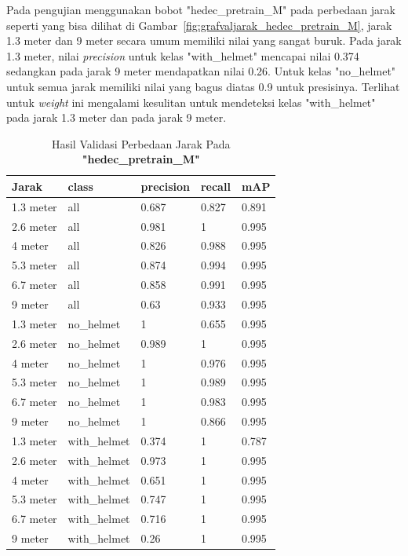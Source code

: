 \begin{enumerate}
  \par Pada pengujian menggunakan bobot "hedec\_pretrain\_M" pada perbedaan jarak seperti yang bisa dilihat di Gambar~\ref{fig:grafvaljarak_hedec_pretrain_M}, jarak 1.3 meter dan 9 meter
  secara umum memiliki nilai yang sangat buruk. Pada jarak 1.3 meter, nilai \emph{precision} untuk kelas "with\_helmet"
  mencapai nilai 0.374 sedangkan pada jarak 9 meter mendapatkan nilai 0.26. Untuk kelas "no\_helmet" untuk semua jarak memiliki
  nilai yang bagus diatas 0.9 untuk presisinya. Terlihat untuk \emph{weight} ini mengalami kesulitan untuk mendeteksi
  kelas "with\_helmet" pada jarak 1.3 meter dan pada jarak 9 meter.


  \begin{longtable}{|l|l|l|l|l|} 
    \caption{Hasil Validasi Perbedaan Jarak Pada \textbf{"hedec\_pretrain\_M"}}
    \label{tb:hasiljarak_hedec_pretrain_M}\\
    \hline
    Jarak     & class        & precision & recall & mAP    \\ 
    \hline
    1.3 meter & all          & 0.687     & 0.827  & 0.891  \\
    2.6 meter & all          & 0.981     & 1      & 0.995  \\
    4 meter   & all          & 0.826     & 0.988  & 0.995  \\
    5.3 meter & all          & 0.874     & 0.994  & 0.995  \\
    6.7 meter & all          & 0.858     & 0.991  & 0.995  \\
    9 meter   & all          & 0.63      & 0.933  & 0.995  \\
    1.3 meter & no\_helmet   & 1         & 0.655  & 0.995  \\
    2.6 meter & no\_helmet   & 0.989     & 1      & 0.995  \\
    4 meter   & no\_helmet   & 1         & 0.976  & 0.995  \\
    5.3 meter & no\_helmet   & 1         & 0.989  & 0.995  \\
    6.7 meter & no\_helmet   & 1         & 0.983  & 0.995  \\
    9 meter   & no\_helmet   & 1         & 0.866  & 0.995  \\
    1.3 meter & with\_helmet & 0.374     & 1      & 0.787  \\
    2.6 meter & with\_helmet & 0.973     & 1      & 0.995  \\
    4 meter   & with\_helmet & 0.651     & 1      & 0.995  \\
    5.3 meter & with\_helmet & 0.747     & 1      & 0.995  \\
    6.7 meter & with\_helmet & 0.716     & 1      & 0.995  \\
    9 meter   & with\_helmet & 0.26      & 1      & 0.995  \\
    \hline
  \end{longtable}


\end{enumerate}
